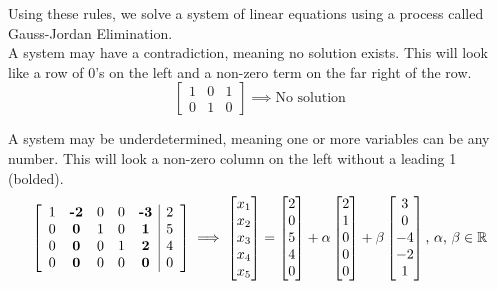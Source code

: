 \noindent
Using these rules, we solve a system of linear equations using a process called Gauss-Jordan Elimination.\\

\noindent
A system may have a contradiction, meaning no solution exists. This will look like a row of 0's on the left and a non-zero term on the far right of the row.
\begin{equation*}
	\left[
		\begin{array}{cc|c}
		1 & 0 & 1 \\
		0 & 1 & 0
		\end{array}
	\right]
	\implies
	\text{No solution}
\end{equation*}

\noindent
A system may be underdetermined, meaning one or more variables can be any number. This will look a non-zero column on the left without a leading 1 (bolded).
\begin{equation*}
	\left[
		\begin{array}{ccccc|c}
			1 & \textbf{-2} & 0 & 0 & \textbf{-3} & 2 \\
			0 & \textbf{0} & 1 & 0 & \textbf{1} & 5 \\
			0 & \textbf{0} & 0 & 1 & \textbf{2} & 4 \\
			0 & \textbf{0} & 0 & 0 & \textbf{0} & 0
		\end{array}
	\right]
	\implies
	\begin{bmatrix}
		x_1 \\
		x_2 \\
		x_3 \\
		x_4 \\
		x_5 \\
	\end{bmatrix} = \begin{bmatrix}
		2 \\
		0 \\
		5 \\
		4 \\
		0
	\end{bmatrix} + \alpha \begin{bmatrix}
		2 \\
		1 \\
		0 \\
		0 \\
		0
	\end{bmatrix} + \beta \begin{bmatrix}
		3 \\
		0 \\
		-4 \\
		-2 \\
		1
	\end{bmatrix} \text{, }\alpha\text{, }\beta \in \mathbb{R}
\end{equation*}

